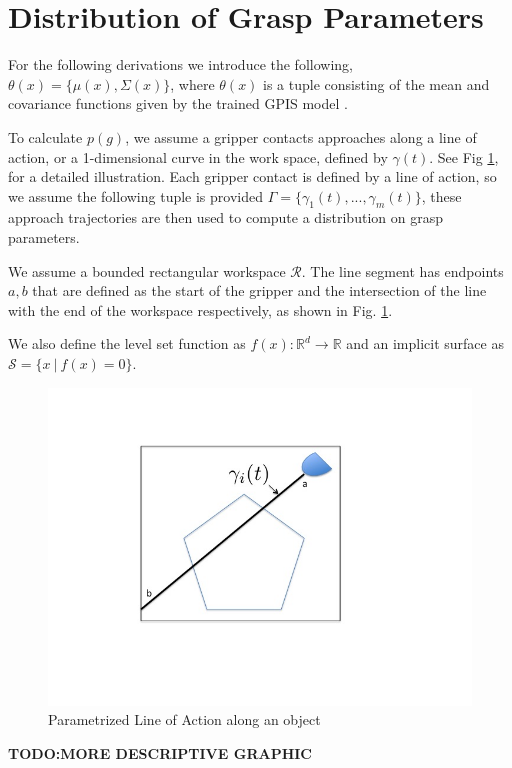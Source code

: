 \documentclass[letterpaper, 10 pt, conference]{ieeeconf}  %
\begin{document}
\section{Distribution of Grasp Parameters}
\label{sec:distgrasp}

 For the following derivations we introduce the following,
 $\theta(x) = \lbrace \mu(x),\Sigma(x) \rbrace$, where $\theta(x)$ is a tuple consisting of the mean and covariance functions given by the trained GPIS model \cite{rasmussen2006} . 
 
 To calculate $p(g)$, we assume a gripper contacts approaches along a line of action, or a 1-dimensional curve in the work space, defined by $\gamma(t)$. See Fig \ref{fig:line_of_action}, for a detailed illustration. Each gripper contact is defined by a line of action, so we assume the following tuple is provided $\Gamma = \lbrace \gamma_1(t),...,\gamma_m(t) \rbrace$, these approach trajectories are then used to compute a distribution on grasp parameters. 
 


We assume a bounded rectangular workspace $\mathcal{R}$.
The line segment has endpoints $a,b$ that are defined as the start of the gripper and the intersection of the line with the end of the workspace respectively, as shown in Fig. 
 \ref{fig:line_of_action}.

 We also define the  level set function as $f(x): \mathbb{R}^d \rightarrow \mathbb{R}$ and an implicit surface as $\mathcal{S} = \{ x \ | \ f(x) = 0 \}$.


\begin{figure}[ht!]
\centering
\includegraphics[scale = 0.3]{figures/Slide1.jpg}
\caption{Parametrized Line of Action along an object}
\vspace*{-10pt}
\label{fig:line_of_action}
\end{figure}
\textbf{TODO:MORE DESCRIPTIVE GRAPHIC}
\end{document}
